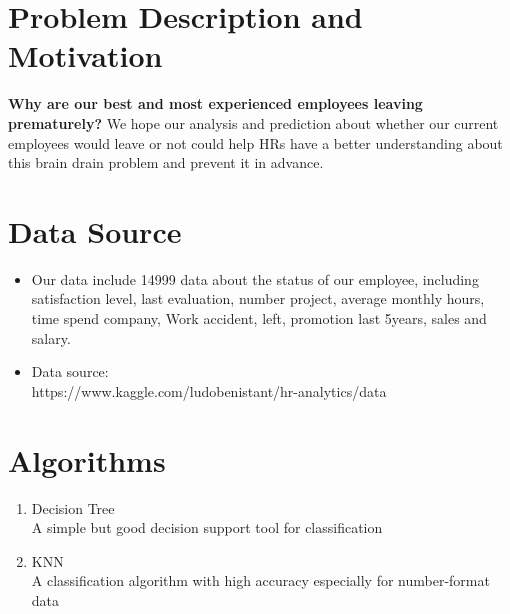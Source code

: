 \documentclass[a4paper, 11pt]{article} %
\begin{document}

\section*{Problem Description and Motivation}
\textbf{Why are our best and most experienced employees leaving prematurely?}
We hope our analysis and prediction about whether our current employees would leave or not could help HRs have a better understanding about this brain drain problem and prevent it in advance.


\section*{Data Source}
\begin{itemize}
\item Our data include 14999 data about the status of our employee, including satisfaction level, last evaluation, number project, average monthly hours, time spend company, Work accident, left, promotion last 5years, sales and salary.
\item Data source: 
\\ https://www.kaggle.com/ludobenistant/hr-analytics/data

\end{itemize}




\section*{Algorithms}

\begin{enumerate}
\item Decision Tree
\\ A simple but good decision support tool for classification
\item KNN
\\ A classification algorithm with high accuracy especially for number-format data

\end{enumerate}



\end{document}

